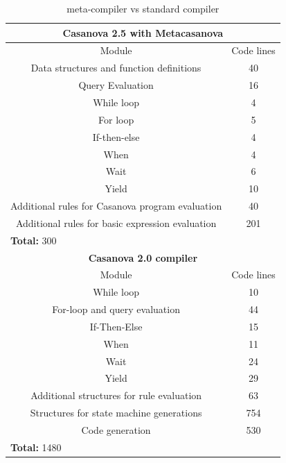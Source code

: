 \begin{table}
	\centering
	\begin{tabular}{|c|c|}
		\hline
		\multicolumn{2}{|c|}{\textbf{Casanova 2.5 with Metacasanova}} \\
		\hline
		Module & Code lines \\
		\hline
		Data structures and function definitions & 40 \\
		\hline
		Query Evaluation & 16 \\
		\hline
		While loop & 4 \\
		\hline
		For loop & 5 \\
		\hline
		If-then-else & 4 \\
		\hline
		When & 4 \\
		\hline
		Wait & 6 \\
		\hline
		Yield & 10 \\
		\hline
		Additional rules for Casanova program evaluation & 40 \\
		\hline
		Additional rules for basic expression evaluation & 201 \\
		\hline
		\multicolumn{2}{|l|}{\textbf{Total: } 300} \\
		\hline
		\multicolumn{2}{|c|}{\textbf{Casanova 2.0 compiler}} \\
		\hline
		Module & Code lines \\
		\hline
		While loop & 10 \\
		\hline
		For-loop and query evaluation & 44 \\
		\hline
		If-Then-Else & 15 \\
		\hline
		When & 11 \\
		\hline
		Wait & 24 \\
		\hline
		Yield & 29 \\
		\hline
		Additional structures for rule evaluation & 63 \\
		\hline
		Structures for state machine generations & 754 \\
		\hline
		Code generation & 530 \\
		\hline
		\multicolumn{2}{|l|}{\textbf{Total: } 1480} \\
		\hline			
	\end{tabular}	
	\caption{meta-compiler vs standard compiler}
	\label{tab:ch_mcnv_languages_casanova_compiler_comparison}
\end{table}

